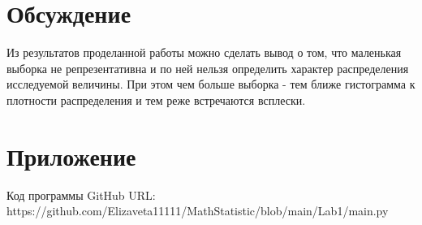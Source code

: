 \documentclass{article}
\begin{document}
\section{Обсуждение}
Из результатов проделанной работы можно сделать вывод о том, что маленькая выборка не репрезентативна и по ней нельзя определить характер распределения исследуемой величины. При этом чем больше выборка - тем ближе гистограмма к плотности распределения и тем реже встречаются всплески.

\section{Приложение}
 Код программы GitHub URL:\\
 https://github.com/Elizaveta11111/MathStatistic/blob/main/Lab1/main.py
\end{document}
